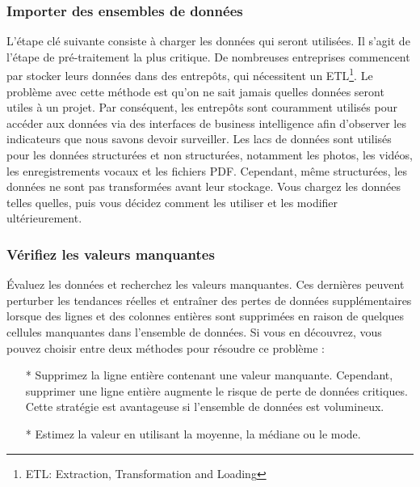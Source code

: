 \documentclass[a4paper, 12pt]{article}
\begin{document}
	\subsubsection{Importer des ensembles de données}L'étape clé suivante consiste à charger les données qui seront utilisées. Il s'agit de l'étape de pré-traitement la plus critique.
	De nombreuses entreprises commencent par stocker leurs données dans des entrepôts, qui nécessitent un ETL\footnote{ETL: Extraction, Transformation and Loading}. Le problème avec cette méthode est qu'on ne sait jamais quelles données seront utiles à un projet. Par conséquent, les entrepôts sont couramment utilisés pour accéder aux données via des interfaces de business intelligence afin d'observer les indicateurs que nous savons devoir surveiller.
	Les lacs de données sont utilisés pour les données structurées et non structurées, notamment les photos, les vidéos, les enregistrements vocaux et les fichiers PDF. Cependant, même structurées, les données ne sont pas transformées avant leur stockage. Vous chargez les données telles quelles, puis vous décidez comment les utiliser et les modifier ultérieurement.
	\subsubsection{Vérifiez les valeurs manquantes}Évaluez les données et recherchez les valeurs manquantes. Ces dernières peuvent perturber les tendances réelles et entraîner des pertes de données supplémentaires lorsque des lignes et des colonnes entières sont supprimées en raison de quelques cellules manquantes dans l'ensemble de données.
	Si vous en découvrez, vous pouvez choisir entre deux méthodes pour résoudre ce problème :
	\begin{itemize}
		\item[*] Supprimez la ligne entière contenant une valeur manquante. Cependant, supprimer une ligne entière augmente le risque de perte de données critiques. Cette stratégie est avantageuse si l'ensemble de données est volumineux. 
		\item[*] 	Estimez la valeur en utilisant la moyenne, la médiane ou le mode.
	\end{itemize}
\end{document}
